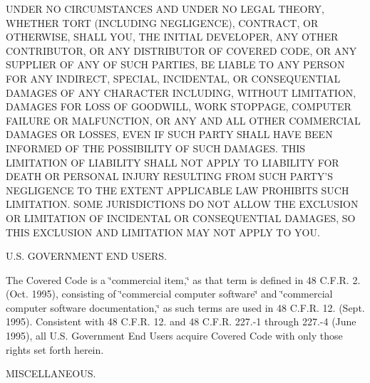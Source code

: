 \begin{DoxyEnumerate}
U\-N\-D\-E\-R N\-O C\-I\-R\-C\-U\-M\-S\-T\-A\-N\-C\-E\-S A\-N\-D U\-N\-D\-E\-R N\-O L\-E\-G\-A\-L T\-H\-E\-O\-R\-Y, W\-H\-E\-T\-H\-E\-R T\-O\-R\-T (I\-N\-C\-L\-U\-D\-I\-N\-G N\-E\-G\-L\-I\-G\-E\-N\-C\-E), C\-O\-N\-T\-R\-A\-C\-T, O\-R O\-T\-H\-E\-R\-W\-I\-S\-E, S\-H\-A\-L\-L Y\-O\-U, T\-H\-E I\-N\-I\-T\-I\-A\-L D\-E\-V\-E\-L\-O\-P\-E\-R, A\-N\-Y O\-T\-H\-E\-R C\-O\-N\-T\-R\-I\-B\-U\-T\-O\-R, O\-R A\-N\-Y D\-I\-S\-T\-R\-I\-B\-U\-T\-O\-R O\-F C\-O\-V\-E\-R\-E\-D C\-O\-D\-E, O\-R A\-N\-Y S\-U\-P\-P\-L\-I\-E\-R O\-F A\-N\-Y O\-F S\-U\-C\-H P\-A\-R\-T\-I\-E\-S, B\-E L\-I\-A\-B\-L\-E T\-O A\-N\-Y P\-E\-R\-S\-O\-N F\-O\-R A\-N\-Y I\-N\-D\-I\-R\-E\-C\-T, S\-P\-E\-C\-I\-A\-L, I\-N\-C\-I\-D\-E\-N\-T\-A\-L, O\-R C\-O\-N\-S\-E\-Q\-U\-E\-N\-T\-I\-A\-L D\-A\-M\-A\-G\-E\-S O\-F A\-N\-Y C\-H\-A\-R\-A\-C\-T\-E\-R I\-N\-C\-L\-U\-D\-I\-N\-G, W\-I\-T\-H\-O\-U\-T L\-I\-M\-I\-T\-A\-T\-I\-O\-N, D\-A\-M\-A\-G\-E\-S F\-O\-R L\-O\-S\-S O\-F G\-O\-O\-D\-W\-I\-L\-L, W\-O\-R\-K S\-T\-O\-P\-P\-A\-G\-E, C\-O\-M\-P\-U\-T\-E\-R F\-A\-I\-L\-U\-R\-E O\-R M\-A\-L\-F\-U\-N\-C\-T\-I\-O\-N, O\-R A\-N\-Y A\-N\-D A\-L\-L O\-T\-H\-E\-R C\-O\-M\-M\-E\-R\-C\-I\-A\-L D\-A\-M\-A\-G\-E\-S O\-R L\-O\-S\-S\-E\-S, E\-V\-E\-N I\-F S\-U\-C\-H P\-A\-R\-T\-Y S\-H\-A\-L\-L H\-A\-V\-E B\-E\-E\-N I\-N\-F\-O\-R\-M\-E\-D O\-F T\-H\-E P\-O\-S\-S\-I\-B\-I\-L\-I\-T\-Y O\-F S\-U\-C\-H D\-A\-M\-A\-G\-E\-S. T\-H\-I\-S L\-I\-M\-I\-T\-A\-T\-I\-O\-N O\-F L\-I\-A\-B\-I\-L\-I\-T\-Y S\-H\-A\-L\-L N\-O\-T A\-P\-P\-L\-Y T\-O L\-I\-A\-B\-I\-L\-I\-T\-Y F\-O\-R D\-E\-A\-T\-H O\-R P\-E\-R\-S\-O\-N\-A\-L I\-N\-J\-U\-R\-Y R\-E\-S\-U\-L\-T\-I\-N\-G F\-R\-O\-M S\-U\-C\-H P\-A\-R\-T\-Y'S N\-E\-G\-L\-I\-G\-E\-N\-C\-E T\-O T\-H\-E E\-X\-T\-E\-N\-T A\-P\-P\-L\-I\-C\-A\-B\-L\-E L\-A\-W P\-R\-O\-H\-I\-B\-I\-T\-S S\-U\-C\-H L\-I\-M\-I\-T\-A\-T\-I\-O\-N. S\-O\-M\-E J\-U\-R\-I\-S\-D\-I\-C\-T\-I\-O\-N\-S D\-O N\-O\-T A\-L\-L\-O\-W T\-H\-E E\-X\-C\-L\-U\-S\-I\-O\-N O\-R L\-I\-M\-I\-T\-A\-T\-I\-O\-N O\-F I\-N\-C\-I\-D\-E\-N\-T\-A\-L O\-R C\-O\-N\-S\-E\-Q\-U\-E\-N\-T\-I\-A\-L D\-A\-M\-A\-G\-E\-S, S\-O T\-H\-I\-S E\-X\-C\-L\-U\-S\-I\-O\-N A\-N\-D L\-I\-M\-I\-T\-A\-T\-I\-O\-N M\-A\-Y N\-O\-T A\-P\-P\-L\-Y T\-O Y\-O\-U.
\item U.\-S. G\-O\-V\-E\-R\-N\-M\-E\-N\-T E\-N\-D U\-S\-E\-R\-S.

The Covered Code is a \char`\"{}commercial item,\char`\"{} as that term is defined in 48 C.\-F.\-R. 2. (Oct. 1995), consisting of \char`\"{}commercial computer
     software\char`\"{} and \char`\"{}commercial computer software documentation,\char`\"{} as such terms are used in 48 C.\-F.\-R. 12. (Sept. 1995). Consistent with 48 C.\-F.\-R. 12. and 48 C.\-F.\-R. 227.-\/1 through 227.-\/4 (June 1995), all U.\-S. Government End Users acquire Covered Code with only those rights set forth herein.
\item M\-I\-S\-C\-E\-L\-L\-A\-N\-E\-O\-U\-S.


\end{DoxyEnumerate}
